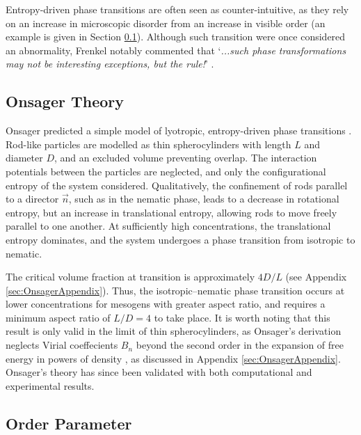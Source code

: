 \documentclass[11pt, a4paper]{article} %
\begin{document}
Entropy-driven phase transitions are often seen as counter-intuitive, as they rely on an increase in microscopic disorder from an increase in visible order (an example is given in Section \ref{sec:OnsagerTheory}). Although such transition were once considered an abnormality, Frenkel notably commented that `\textit{...such phase transformations may not be interesting exceptions, but the rule!}' \cite{Frenkel1999}.

\subsection{Onsager Theory} \label{sec:OnsagerTheory}

Onsager predicted a simple model of lyotropic, entropy-driven phase transitions \cite{Onsager1949}. Rod-like particles are modelled as thin spherocylinders with length $L$ and diameter $D$, and an excluded volume preventing overlap. The interaction potentials between the particles are neglected, and only the configurational entropy of the system considered. Qualitatively, the confinement of rods parallel to a director $\Vec{n}$, such as in the nematic phase, leads to a decrease in rotational entropy, but an increase in translational entropy, allowing rods to move freely parallel to one another. At sufficiently high concentrations, the translational entropy dominates, and the system undergoes a phase transition from isotropic to nematic. 

The critical volume fraction at transition is approximately $4D/L$ (see Appendix \ref{sec:OnsagerAppendix}). Thus, the isotropic--nematic phase transition occurs at lower concentrations for mesogens with greater aspect ratio, and requires a minimum aspect ratio of $L/D = 4$ to take place. It is worth noting that this result is only valid in the limit of thin spherocylinders, as Onsager's derivation neglects Virial coeffecients $B_{n}$ beyond the second order in the expansion of free energy in powers of density \cite{Frenkel1987}, as discussed in Appendix \ref{sec:OnsagerAppendix}. Onsager's theory has since been validated with both computational \cite{Frenkel1987b, Frenkel1988b} and experimental \cite{Kubo1979,Oldenbourg1988,Fraden1993} results.



\subsection{Order Parameter}
\end{document}
